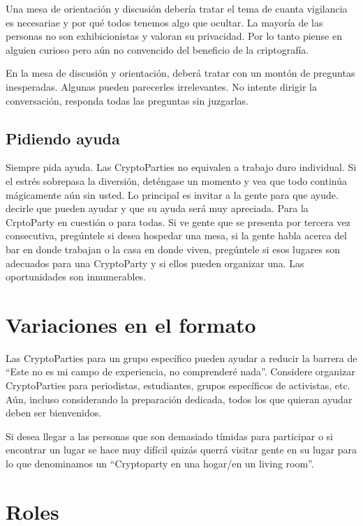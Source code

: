 \documentclass[10pt,a5paper,twoside,,]{book}
\begin{document}
Una mesa de orientación y discusión debería tratar el tema de cuanta
vigilancia es necesariae y por qué todos tenemos algo que ocultar. La
mayoría de las personas no son exhibicionistas y valoran su privacidad.
Por lo tanto piense en alguien curioso pero aún no convencido del
beneficio de la criptografía.

En la mesa de discusión y orientación, deberá tratar con un montón de
preguntas inesperadas. Algunas pueden parecerles irrelevantes. No
intente dirigir la conversación, responda todas las preguntas sin
juzgarlas.

\subsection{Pidiendo ayuda}\label{pidiendo-ayuda}

Siempre pida ayuda. Las CryptoParties no equivalen a trabajo duro
individual. Si el estrés sobrepasa la diversión, deténgase un momento y
vea que todo continúa mágicamente aún sin usted. Lo principal es invitar
a la gente para que ayude. decirle que pueden ayudar y que su ayuda será
muy apreciada. Para la CrptoParty en cuestión o para todas. Si ve gente
que se presenta por tercera vez consecutiva, pregúntele si desea
hospedar una mesa, si la gente habla acerca del bar en donde trabajan o
la casa en donde viven, pregúntele si esos lugares son adecuados para
una CryptoParty y si ellos pueden organizar una. Las oportunidades son
innumerables.

\section{Variaciones en el formato}\label{variaciones-en-el-formato}

Las CryptoParties para un grupo específico pueden ayudar a reducir la
barrera de ``Este no es mi campo de experiencia, no comprenderé nada''.
Considere organizar CryptoParties para periodistas, estudiantes, grupos
específicos de activistas, etc. Aún, incluso considerando la preparación
dedicada, todos los que quieran ayudar deben ser bienvenidos.

Si desea llegar a las personas que son demasiado tímidas para participar
o si encontrar un lugar se hace muy difícil quizás querrá visitar gente
en su lugar para lo que denominamos un ``Cryptoparty en una hogar/en un
living room''.

\section{Roles}\label{roles}
\end{document}
